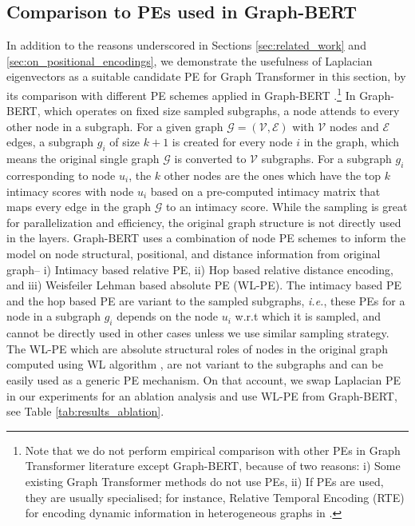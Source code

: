 \documentclass[letterpaper]{article} %
\begin{document}
\subsection{Comparison to PEs used in Graph-BERT}
In addition to the
reasons underscored in Sections \ref{sec:related_work} and \ref{sec:on_positional_encodings}, we demonstrate the usefulness of Laplacian eigenvectors as a suitable candidate PE for Graph Transformer in this section, by its comparison with different PE schemes applied in Graph-BERT \cite{zhang2020graph}.\footnote{Note that we do not perform empirical comparison with other PEs in Graph Transformer literature except Graph-BERT, because of two reasons: i) Some existing Graph Transformer methods do not use PEs, ii) If PEs are used, they are usually specialised; for instance, Relative Temporal Encoding (RTE) for encoding dynamic information in heterogeneous graphs in \cite{hu2020heterogeneous}.} In Graph-BERT, which operates on fixed size sampled subgraphs, a node attends to every other node in a subgraph.
For a given graph $\mathcal{G}=(\mathcal{V},\mathcal{E})$ with $\mathcal{V}$ nodes and $\mathcal{E}$ edges, a subgraph $g_i$ of size $k+1$ is created for every node $i$ in the graph, which means the original single graph $\mathcal{G}$ is converted to $\mathcal{V}$ subgraphs. For a subgraph $g_i$ corresponding to node $u_i$, the $k$ other nodes are the ones which have the top $k$ intimacy scores with node $u_i$ based on a pre-computed intimacy matrix that maps every edge in the graph $\mathcal{G}$ to an intimacy score.
While the sampling is great for parallelization and efficiency, the original graph structure is not directly used in the layers. Graph-BERT uses a combination of node PE schemes to inform the model on node structural, positional, and distance information from original graph-- i) Intimacy based relative PE, ii) Hop based relative distance encoding, and iii) Weisfeiler Lehman based absolute PE (WL-PE). The intimacy based PE and the hop based PE are variant to the sampled subgraphs, \textit{i.e.}, these PEs for a node in a subgraph $g_i$ depends on the node $u_i$ w.r.t which it is sampled, and cannot be directly used in other cases unless we use similar sampling strategy. The WL-PE which are absolute structural roles of nodes in the original graph computed using WL algorithm \cite{zhang2020graph, niepert2016learning}, are not variant to the subgraphs and can be easily used as a generic PE mechanism. On that account, we swap Laplacian PE in our experiments for an ablation analysis and use WL-PE from Graph-BERT, see Table \ref{tab:results_ablation}.
\end{document}
